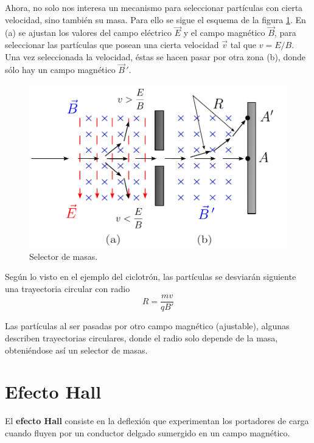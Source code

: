 \begin{ejemplo}
   
Ahora, no solo nos interesa un mecanismo para seleccionar  partículas con cierta velocidad, sino también su masa. Para ello se sigue el esquema de la figura \ref{fig:Selector-Masas}. En (a) se ajustan los valores del campo eléctrico $\Vec{E}$ y el campo magnético $\Vec{B}$, para seleccionar las partículas que posean una cierta velocidad $\Vec{v}$ tal que $v = E/B$. Una vez seleccionada la velocidad, éstas se hacen pasar por otra zona (b), donde sólo hay un campo magnético $\Vec{B}\,'$.

\begin{figure}[H]
    \centering
    \includegraphics[scale = 0.7]{Figuras/Selector-Masas.pdf}
    \caption{Selector de masas.}
    \label{fig:Selector-Masas}
\end{figure}

Según lo visto en el ejemplo del ciclotrón, las partículas se desviarán siguiente una trayectoria circular con radio 
\begin{equation*}
\boxed{R = \frac{mv}{qB'}}
\end{equation*}

 Las partículas al ser pasadas por otro campo magnético (ajustable), algunas describen trayectorias circulares, donde el radio solo depende de la masa, obteniéndose así un selector de masas.
\end{ejemplo}

\section{Efecto Hall}

El \textbf{efecto Hall} consiste en la deflexión que experimentan los portadores de carga cuando fluyen por un conductor delgado sumergido en un campo magnético.

